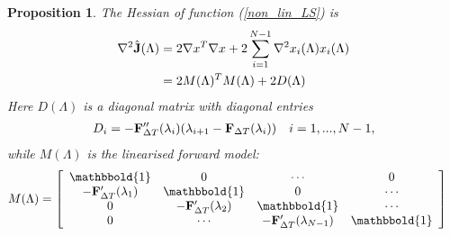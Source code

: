 \documentclass[11pt,a4paper]{article}
\newtheorem{proposition}{Proposition}
\begin{document}
\begin{proposition}\label{NonLin_prop}
The Hessian of function (\ref{non_lin_LS}) is
\begin{align*}
\nabla^2 \hat{\bold J}(\Lambda) &= 2\nabla x^T\nabla x + 2\sum_{i=1}^{N-1} \nabla^2 x_i(\Lambda) x_i(\Lambda)\\
&=2M(\Lambda)^TM(\Lambda) + 2D(\Lambda)
\end{align*}
Here $D(\Lambda)$ is a diagonal matrix with diagonal entries 
\begin{align*}
D_i=-\bold{F}_{\Delta T}''(\lambda_i)(\lambda_{i+1}-\bold F_{\Delta T}(\lambda_i)) \quad i=1,...,N-1,
\end{align*}
while $M(\Lambda)$ is the linearised forward model:
\begin{align*}
M(\Lambda) &= \left[ \begin{array}{cccc}
   \mathbbold{1} & 0 & \cdots & 0 \\  
   -\bold{F}_{\Delta T}'(\lambda_{1}) & \mathbbold{1} & 0 & \cdots \\ 
   0 &-\bold{F}_{\Delta T}'(\lambda_{2}) & \mathbbold{1}  & \cdots \\
   0 &\cdots &-\bold{F}_{\Delta T}'(\lambda_{N-1}) & \mathbbold{1}  \\
   \end{array}  \right]
\end{align*}	
\end{proposition}
\end{document}
